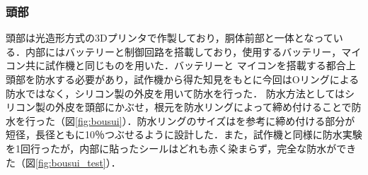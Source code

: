 \subsubsection{頭部}
頭部は光造形方式の3Dプリンタで作製しており，胴体前部と一体となっている．内部にはバッテリーと制御回路を搭載しており，使用するバッテリー，マイコン共に試作機と同じものを用いた．バッテリーと
マイコンを搭載する都合上頭部を防水する必要があり，試作機から得た知見をもとに今回はOリングによる防水ではなく，シリコン製の外皮を用いて防水を行った．
防水方法としてはシリコン製の外皮を頭部にかぶせ，根元を防水リングによって締め付けることで防水を行った（図\ref{fig:bousui}）．防水リングのサイズは\cite{juuiti}を参考に締め付ける部分が
短径，長径ともに10％つぶせるように設計した．また，試作機と同様に防水実験を1回行ったが，内部に貼ったシールはどれも赤く染まらず，完全な防水ができた（図\ref{fig:bousui_test}）．

